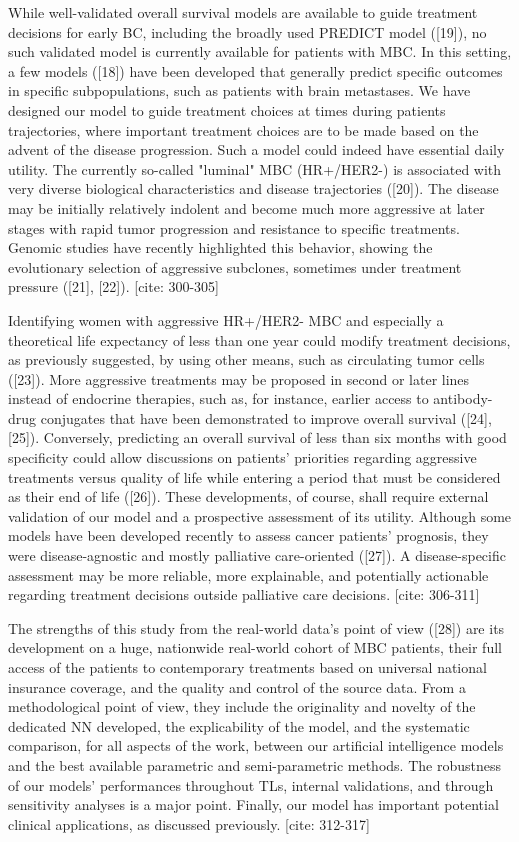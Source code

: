 \documentclass[a4paper,10pt]{article}
\begin{document}
While well-validated overall survival models are available to guide treatment decisions for early BC, including the broadly used PREDICT model ([19]), no such validated model is currently available for patients with MBC. In this setting, a few models ([18]) have been developed that generally predict specific outcomes in specific subpopulations, such as patients with brain metastases. We have designed our model to guide treatment choices at times during patients trajectories, where important treatment choices are to be made based on the advent of the disease progression. Such a model could indeed have essential daily utility. The currently so-called "luminal" MBC (HR+/HER2-) is associated with very diverse biological characteristics and disease trajectories ([20]). The disease may be initially relatively indolent and become much more aggressive at later stages with rapid tumor progression and resistance to specific treatments. Genomic studies have recently highlighted this behavior, showing the evolutionary selection of aggressive subclones, sometimes under treatment pressure ([21], [22]). [cite: 300-305]

Identifying women with aggressive HR+/HER2- MBC and especially a theoretical life expectancy of less than one year could modify treatment decisions, as previously suggested, by using other means, such as circulating tumor cells ([23]). More aggressive treatments may be proposed in second or later lines instead of endocrine therapies, such as, for instance, earlier access to antibody-drug conjugates that have been demonstrated to improve overall survival ([24], [25]). Conversely, predicting an overall survival of less than six months with good specificity could allow discussions on patients' priorities regarding aggressive treatments versus quality of life while entering a period that must be considered as their end of life ([26]). These developments, of course, shall require external validation of our model and a prospective assessment of its utility. Although some models have been developed recently to assess cancer patients' prognosis, they were disease-agnostic and mostly palliative care-oriented ([27]). A disease-specific assessment may be more reliable, more explainable, and potentially actionable regarding treatment decisions outside palliative care decisions. [cite: 306-311]

The strengths of this study from the real-world data's point of view ([28]) are its development on a huge, nationwide real-world cohort of MBC patients, their full access of the patients to contemporary treatments based on universal national insurance coverage, and the quality and control of the source data. From a methodological point of view, they include the originality and novelty of the dedicated NN developed, the explicability of the model, and the systematic comparison, for all aspects of the work, between our artificial intelligence models and the best available parametric and semi-parametric methods. The robustness of our models' performances throughout TLs, internal validations, and through sensitivity analyses is a major point. Finally, our model has important potential clinical applications, as discussed previously. [cite: 312-317]
\end{document}
